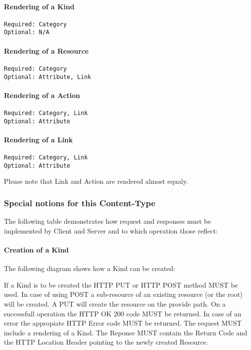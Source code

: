 \documentclass[10pt,a4paper]{article}
\begin{document}
\paragraph{Rendering of a Kind}
\begin{verbatim}
Required: Category
Optional: N/A
\end{verbatim}

\paragraph{Rendering of a Resource}
\begin{verbatim}
Required: Category
Optional: Attribute, Link
\end{verbatim}

\paragraph{Rendering of a Action}
\begin{verbatim}
Required: Category, Link
Optional: Attribute
\end{verbatim}

\paragraph{Rendering of a Link}
\begin{verbatim}
Required: Category, Link
Optional: Attribute
\end{verbatim}
Please note that Link and Action are rendered almost equaly.

\subsubsection{Special notions for this Content-Type}
The following table demonstrates how request and responses must be implemented by Client and Server and to which operation those reflect:

\paragraph{Creation of a Kind}
The following diagram shows how a Kind can be created:



If a Kind is to be created the HTTP PUT or HTTP POST method MUST be used. In case of using POST a sub-resource of an existing resource (or the root) will be created. A PUT will create the resource on the provide path. On a successfull operation the HTTP OK 200 code MUST be returned. In case of an error the appropiate HTTP Error code MUST be returned. The request MUST include a rendering of a Kind. The Reponse MUST contain the Return Code and the HTTP Location Header pointing to the newly created Resource.
\end{document}
